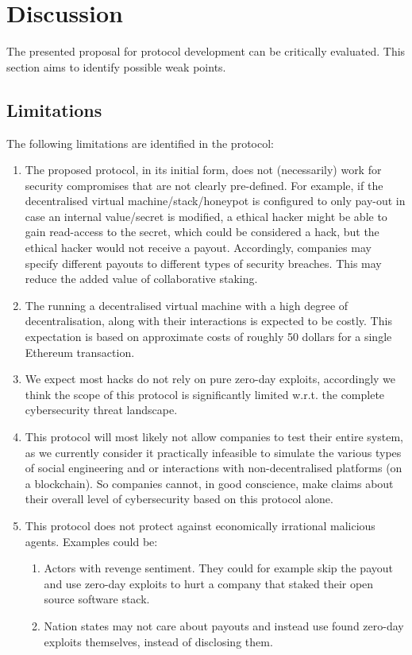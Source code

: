 \section{Discussion}
\label{sec:discussion}
The presented proposal for protocol development can be critically evaluated. This section aims to identify possible weak points.
\subsection{Limitations}
The following limitations are identified in the protocol:
\begin{enumerate}
    \item The proposed protocol, in its initial form, does not (necessarily) work for security compromises that are not clearly pre-defined. For example, if the decentralised virtual machine/stack/honeypot is configured to only pay-out in case an internal value/secret is modified, a ethical hacker might be able to gain read-access to the secret, which could be considered a hack, but the ethical hacker would not receive a payout. Accordingly, companies may specify different payouts to different types of security breaches. This may reduce the added value of collaborative staking.
    \item The running a decentralised virtual machine with a high degree of decentralisation, along with their interactions is expected to be costly. This expectation is based on approximate costs of roughly 50 dollars for a single Ethereum transaction.
    \item We expect most hacks do not rely on pure zero-day exploits, accordingly we think the scope of this protocol is significantly limited w.r.t. the complete cybersecurity threat landscape.
    \item This protocol will most likely not allow companies to test their entire system, as we currently consider it practically infeasible to simulate the various types of social engineering and or interactions with non-decentralised platforms (on a blockchain). So companies cannot, in good conscience, make claims about their overall level of cybersecurity based on this protocol alone.
    \item This protocol does not protect against economically irrational malicious agents. Examples could be:
    \begin{enumerate}
        \item Actors with revenge sentiment. They could for example skip the payout and use zero-day exploits to hurt a company that staked their open source software stack.
        \item Nation states may not care about payouts and instead use found zero-day exploits themselves, instead of disclosing them.
    \end{enumerate}
\end{enumerate}

